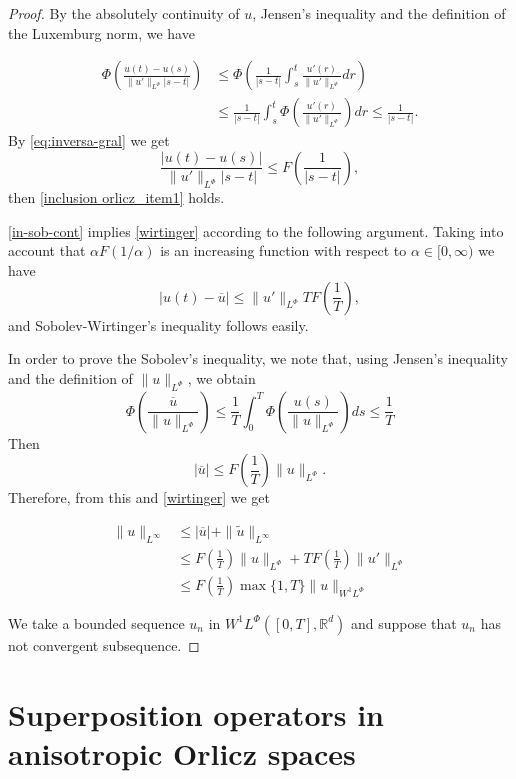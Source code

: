 \documentclass[twoside]{article}
\theoremstyle{remark}
\newcommand{\orlnor}{\|_{L^{\Phi}}}
\newcommand{\linf}{\|_{L^{\infty}}}
\newcommand{\lphi}{L^{\Phi}}
\newcommand{\wphi}{W^{1}\lphi}
\newcommand{\sobnor}{\|_{W^{1}\lphi}}
\newcommand{\rr}{\mathbb{R}}
\renewcommand{\leq}{\leqslant}
\begin{document}
\begin{proof} By the absolutely continuity of $u$, Jensen's inequality and the definition of 
the Luxemburg norm, we have

\[
 \begin{split}
    \Phi\left( \frac{u(t)-u(s)}{\|u'\orlnor |s-t|}\right) &\leq  \Phi\left( \frac{1}{ |s-t|}\int_s^t  \frac{u'(r)}{\|u'\orlnor }dr\right)\\
    &\leq   \frac{1}{ |s-t|}\int_s^t  \Phi\left(\frac{u'(r)}{\|u'\orlnor }\right)dr
    \leq \frac{1}{ |s-t|}.
 \end{split}
\]
By \eqref{eq:inversa-gral} we get
\[
    \frac{|u(t)-u(s)|}{\|u'\orlnor |s-t|} 
    \leq  F\left(\frac{1}{ |s-t|}\right),
\]
then  \ref{inclusion orlicz_item1} holds.

\ref{in-sob-cont}  implies \ref{wirtinger} according to the following argument.  
Taking into account that $\alpha F(1/\alpha)$ is an increasing function 
with respect to $\alpha\in [0,\infty)$ we have
\[|u(t)-\overline{u}|\leq  \|u'\orlnor T F\left(\frac{1}{T}\right),\]
and Sobolev-Wirtinger's inequality follows easily.

In order to prove the Sobolev's inequality, we note that, using Jensen's inequality and 
the definition of $\|u\orlnor$, we obtain
\[ \Phi\left( \frac{ \overline{u}}{\|u\orlnor} \right) \leq
\frac{1}{T}\int_0^T\Phi\left(\frac{u(s)}{\|u\orlnor}\right)ds\leq\frac{1}{T}
\]
Then
\[|\overline{u}|\leq F\left(\frac{1}{T}\right) \|u\orlnor.\]
Therefore, from this and \eqref{wirtinger} we get

\[\begin{split}
 \|u\linf &\leq |\overline{u}|+\|\tilde{u}\linf\\
 &\leq  
 F\left(\frac{1}{T}\right) \|u\orlnor+T F\left(\frac{1}{T}\right)\|u'\orlnor\\
 &\leq F\left(\frac{1}{T}\right)\max\{1,T\}\|u\sobnor
 \end{split}
 \]
 



We take a bounded sequence
$u_n$ in $\wphi([0,T],\rr^d)$ and suppose that $u_n$ has not convergent subsequence.


\end{proof}




\section{Superposition operators in anisotropic Orlicz spaces}
\end{document}
